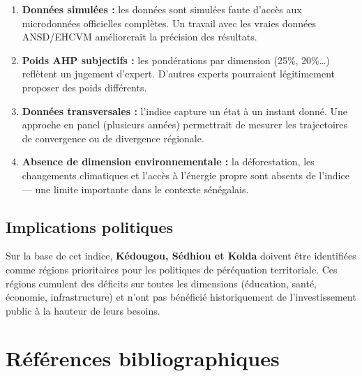 \documentclass[
]{article}
\providecommand{\tightlist}{%
  \setlength{\itemsep}{0pt}\setlength{\parskip}{0pt}}
\begin{document}
\begin{enumerate}
\def\labelenumi{\arabic{enumi}.}
\tightlist
\item
  \textbf{Données simulées :} les données sont simulées faute d'accès
  aux microdonnées officielles complètes. Un travail avec les vraies
  données ANSD/EHCVM améliorerait la précision des résultats.
\item
  \textbf{Poids AHP subjectifs :} les pondérations par dimension (25\%,
  20\%\ldots) reflètent un jugement d'expert. D'autres experts
  pourraient légitimement proposer des poids différents.
\item
  \textbf{Données transversales :} l'indice capture un état à un instant
  donné. Une approche en panel (plusieurs années) permettrait de mesurer
  les trajectoires de convergence ou de divergence régionale.
\item
  \textbf{Absence de dimension environnementale :} la déforestation, les
  changements climatiques et l'accès à l'énergie propre sont absents de
  l'indice --- une limite importante dans le contexte sénégalais.
\end{enumerate}

\subsection{Implications politiques}\label{implications-politiques}

Sur la base de cet indice, \textbf{Kédougou, Sédhiou et Kolda} doivent
être identifiées comme régions prioritaires pour les politiques de
péréquation territoriale. Ces régions cumulent des déficits sur toutes
les dimensions (éducation, santé, économie, infrastructure) et n'ont pas
bénéficié historiquement de l'investissement public à la hauteur de
leurs besoins.

\newpage

\section*{Références
bibliographiques}\label{ruxe9fuxe9rences-bibliographiques}

\end{document}
